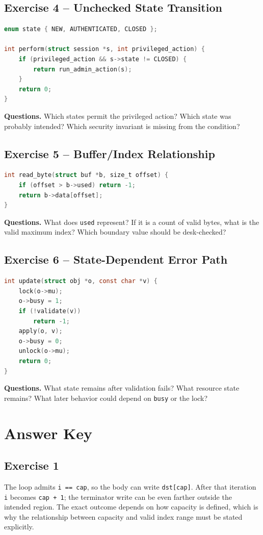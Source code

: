 \documentclass[10pt]{article}
\newcommand{\workarea}[1]{\par\smallskip\noindent\begin{tcolorbox}[height=#1,colback=white,colframe=linegray,boxrule=0.5pt,arc=0pt,left=2pt,right=2pt,top=2pt,bottom=2pt]\mbox{}\end{tcolorbox}\par}
\begin{document}
\subsection{Exercise 4 -- Unchecked State Transition}
\begin{lstlisting}[language=C]
enum state { NEW, AUTHENTICATED, CLOSED };

int perform(struct session *s, int privileged_action) {
    if (privileged_action && s->state != CLOSED) {
        return run_admin_action(s);
    }
    return 0;
}
\end{lstlisting}
\textbf{Questions.} Which states permit the privileged action? Which state was probably intended? Which security invariant is missing from the condition?
\workarea{0.9in}

\subsection{Exercise 5 -- Buffer/Index Relationship}
\begin{lstlisting}[language=C]
int read_byte(struct buf *b, size_t offset) {
    if (offset > b->used) return -1;
    return b->data[offset];
}
\end{lstlisting}
\textbf{Questions.} What does \texttt{used} represent? If it is a count of valid bytes, what is the valid maximum index? Which boundary value should be desk-checked?
\workarea{0.9in}

\subsection{Exercise 6 -- State-Dependent Error Path}
\begin{lstlisting}[language=C]
int update(struct obj *o, const char *v) {
    lock(o->mu);
    o->busy = 1;
    if (!validate(v))
        return -1;
    apply(o, v);
    o->busy = 0;
    unlock(o->mu);
    return 0;
}
\end{lstlisting}
\textbf{Questions.} What state remains after validation fails? What resource state remains? What later behavior could depend on \texttt{busy} or the lock?
\workarea{0.9in}
\clearpage

\section{Answer Key}
\subsection*{Exercise 1}
The loop admits \texttt{i == cap}, so the body can write \texttt{dst[cap]}. After that iteration \texttt{i} becomes \texttt{cap + 1}; the terminator write can be even farther outside the intended region. The exact outcome depends on how capacity is defined, which is why the relationship between capacity and valid index range must be stated explicitly.
\end{document}
